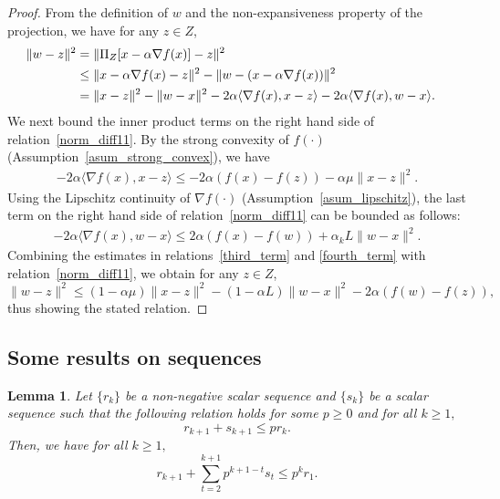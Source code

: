 \documentclass{article}
\def\la{\langle}
\def\ra{\rangle}
\def\a{\alpha}
\theoremstyle{plain}
\newtheorem{lemma}[theorem]{Lemma}
\theoremstyle{definition}
\theoremstyle{remark}
\begin{document}
 \begin{proof}
   From the definition of $w$ and the non-expansiveness property of the projection,  we have for any $z \in Z$,
    \begin{align}\label{norm_diff11}
        \|w - z\|^2 &= \| \Pi_Z[x - \a \nabla f(x)] - z\|^2\cr
        &\leq \| x - \a \nabla f(x) - z\|^2 - \| w - (x - \a \nabla f(x)) \|^2 \cr
        & = \| x -z \|^2 - \| w - x \|^2 
        - 2 \a\la \nabla f(x), x -z \ra 
        - 2 \a \la \nabla f(x), w - x \ra.
    \end{align}
    We next bound the inner product terms on the right hand side of relation~\eqref{norm_diff11}. By the strong convexity of $f(\cdot)$ (Assumption~\ref{asum_strong_convex}),
    we have
    \begin{align}\label{third_term}
        - 2 \a \la \nabla f(x), x -z \ra \leq - 2 \a (f(x) - f(z)) - \a \mu \| x - z \|^2 .
    \end{align}
    Using the Lipschitz continuity of $\nabla f(\cdot)$ (Assumption~\ref{asum_lipschitz}), the last term on the right hand side of relation~\eqref{norm_diff11} can be bounded as follows:
    \begin{align}\label{fourth_term}
        - 2 \a \la \nabla f(x), w - x \ra 
        \leq 2 \a (f(x) - f(w)) + \a_k L \|w - x \|^2 .
    \end{align}
    Combining the estimates in relations~\eqref{third_term} and \eqref{fourth_term} with relation~\eqref{norm_diff11}, we obtain for any $z\in Z$,
    \[\|w - z\|^2 \leq (1-\a \mu) \| x -z\|^2 - (1 - \a L) \| w - x \|^2 - 2 \a (f(w) - f(z)),\]
    thus showing the stated relation.
\end{proof}



\subsection{Some results on sequences}
\begin{lemma}\label{lem-scalar-seq}
Let $\{r_k\}$ be a non-negative scalar sequence 
and $\{s_k\}$ be a scalar sequence such that  the following relation holds for some $p\ge0$ and for all $k\ge1,$
\[r_{k+1}+s_{k+1}\le p r_k.\]
Then, we have for all $k\ge 1,$
\[r_{k+1} + \sum_{t=2}^{k+1} p^{k+1-t} s_t\le p^k r_1.\]
\end{lemma}
\end{document}
